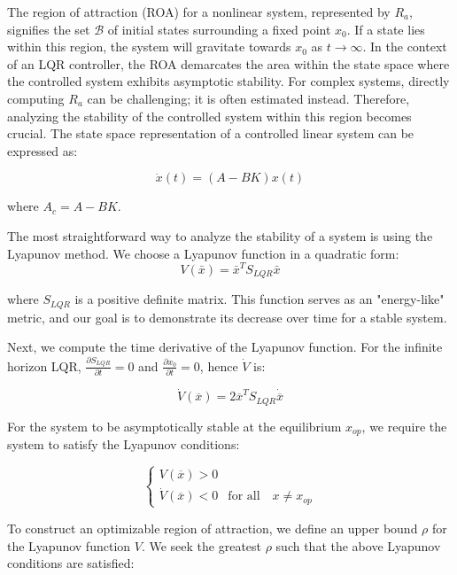 The region of attraction (ROA) for a nonlinear system, represented by \(R_a\), signifies the set \(\mathcal{B}\) of initial states surrounding a fixed point \(x_0\). If a state lies within this region, the system will gravitate towards \(x_0\) as \(t \rightarrow \infty\). In the context of an LQR controller, the ROA demarcates the area within the state space where the controlled system exhibits asymptotic stability. For complex systems, directly computing \(R_a\) can be challenging; it is often estimated instead. Therefore, analyzing the stability of the controlled system within this region becomes crucial. The state space representation of a controlled linear system can be expressed as:

\begin{equation}
\dot{x}(t) = (A - BK)x(t)
\end{equation}

where \(A_c = A - BK\).

The most straightforward way to analyze the stability of a system is using the Lyapunov method. We choose a Lyapunov function in a quadratic form:
\begin{equation}
  V(\bar{x}) = \bar{x}^T S_{LQR} \bar{x} 
\end{equation}

where \(S_{LQR}\) is a positive definite matrix. This function serves as an "energy-like" metric, and our goal is to demonstrate its decrease over time for a stable system.

Next, we compute the time derivative of the Lyapunov function. For the infinite horizon LQR, \(\frac{\partial S_{LQR}}{\partial t} = 0\) and \(\frac{\partial x_0}{\partial t} = 0\), hence \(\dot{V}\) is:

\begin{equation}
\dot{V}(\overline{x}) = 2\overline{x}^{T}S_{LQR}\dot{\overline{x}}
\end{equation}

For the system to be asymptotically stable at the equilibrium \(x_{op}\), we require the system to satisfy the Lyapunov conditions:

\begin{equation}
\begin{cases}
   V(\overline{x}) > 0 \\
   \dot{V}(\overline{x}) < 0 & \text{for all} \quad x \neq x_{op}
\end{cases}
\end{equation}

To construct an optimizable region of attraction, we define an upper bound \(\rho\) for the Lyapunov function \(V\). We seek the greatest \(\rho\) such that the above Lyapunov conditions are satisfied:

